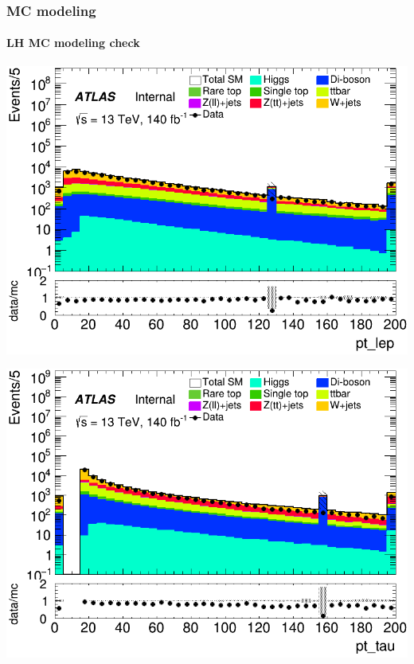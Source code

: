 \documentclass[usenames,dvipsnames]{beamer}
\begin{document}
\begin{frame}
\begin{minipage}{0.32\textwidth}
    \end{minipage}
    
\end{frame}

\begin{frame}
	\frametitle{MC modeling}
	\framesubtitle{LH MC modeling check}
	
    \begin{minipage}{0.32\textwidth}
        \centering
        \includegraphics[width=\textwidth]{graphics/LH_met/LH_met_pt_lep.png}
    \end{minipage}
    \hfill
    \begin{minipage}{0.32\textwidth}
        \centering
        \includegraphics[width=\textwidth]{graphics/LH_met/LH_met_pt_tau.png}
    \end{minipage}

\end{frame}
\end{document}
